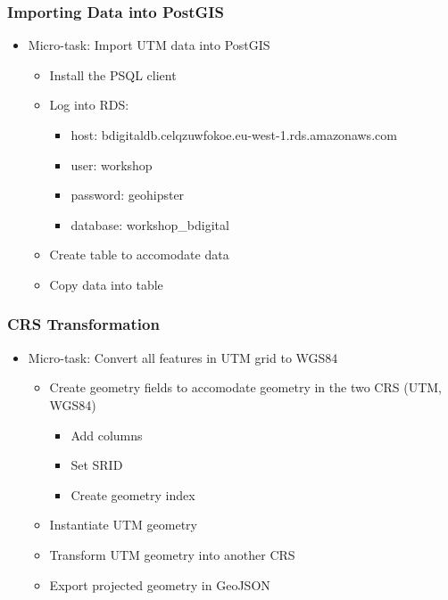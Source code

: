 \documentclass[hyperref={pdfpagelabels=true}]{beamer}
\begin{document}
\begin{frame}
\frametitle{Importing Data into PostGIS}
\begin{itemize}
  \item<1->Micro-task: Import UTM data into PostGIS
  \begin{itemize}
    \item<2->Install the PSQL client
    \item<2->Log into RDS:
    \begin{itemize}    
      \item<3->host: bdigitaldb.celqzuwfokoe.eu-west-1.rds.amazonaws.com
      \item<3->user: workshop
      \item<3->password: geohipster
      \item<3->database: workshop\_bdigital      
    \end{itemize}
    \item<4->Create table to accomodate data
    \item<5->Copy data into table
  \end{itemize}
\end{itemize}
\end{frame}

\begin{frame}
\frametitle{CRS Transformation}
\begin{itemize}
  \item<1->Micro-task: Convert all features in UTM grid to WGS84
  \begin{itemize}
    \item<2->Create geometry fields to accomodate geometry in the two CRS (UTM, WGS84)
    \begin{itemize}    
      \item<3->Add columns
      \item<3->Set SRID
      \item<3->Create geometry index
    \end{itemize}
    \item<4->Instantiate UTM geometry
    \item<5->Transform UTM geometry into another CRS
    \item<6->Export projected geometry in GeoJSON
  \end{itemize}
\end{itemize}
\end{frame}
\end{document}
